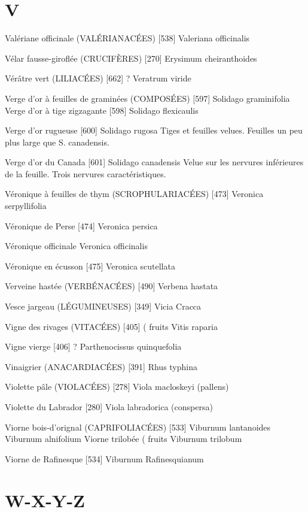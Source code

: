 \chapter*{V}

Valériane officinale (VALÉRIANACÉES)  [538]
				Valeriana officinalis

Vélar fausse-giroflée (CRUCIFÈRES)  [270]
				Erysimum cheiranthoides

Vérâtre vert (LILIACÉES)  [662]						?
				Veratrum viride

Verge d’or à feuilles de graminées (COMPOSÉES)  [597]
				Solidago graminifolia
Verge d’or à tige zigzagante  [598]
				Solidago flexicaulis

Verge d’or rugueuse  [600]
				Solidago rugosa
Tiges et feuilles velues. Feuilles un peu plus large que S. canadensis.

Verge d’or du Canada  [601]
				Solidago canadensis
Velue sur les nervures inférieures de la feuille. Trois nervures caractéristiques.

Véronique à feuilles de thym (SCROPHULARIACÉES)  [473]
				Veronica serpyllifolia

Véronique de Perse  [474]
				Veronica persica

Véronique officinale
				Veronica officinalis

Véronique en écusson  [475]
				Veronica scutellata


Verveine hastée (VERBÉNACÉES)  [490]
				Verbena hastata

Vesce jargeau (LÉGUMINEUSES)  [349]
				Vicia Cracca

Vigne des rivages (VITACÉES)  [405]				( fruits
				Vitis raparia

Vigne vierge  [406]							?
				Parthenocissus quinquefolia

Vinaigrier (ANACARDIACÉES)  [391]
				Rhus typhina

Violette pâle (VIOLACÉES)  [278]
				Viola macloskeyi (pallens)

Violette du Labrador  [280]
				Viola labradorica (conspersa)

Viorne bois-d’orignal (CAPRIFOLIACÉES)  [533]
				Viburnum lantanoides
				Viburnum alnifolium
Viorne trilobée							( fruits
				Viburnum trilobum

Viorne de Rafinesque  [534]
				Viburnum Rafinesquianum

\chapter*{W-X-Y-Z}


	
	
